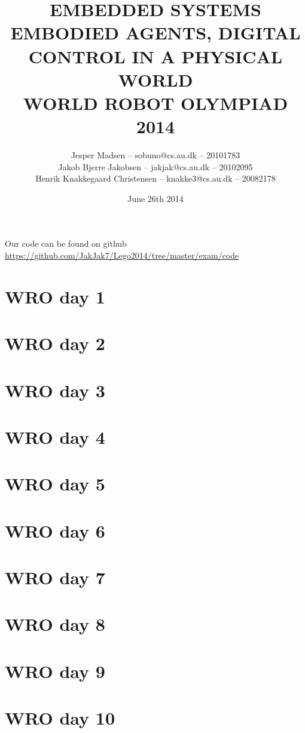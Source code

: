 \documentclass[a4paper,11pt,article,oneside]{memoir}
\title{EMBEDDED SYSTEMS\\\small{EMBODIED AGENTS, DIGITAL CONTROL IN A PHYSICAL WORLD\\WORLD ROBOT OLYMPIAD 2014}}
\author{Jesper Madsen -- sobuno@cs.au.dk -- 20101783\\Jakob Bjerre Jakobsen -- jakjak@cs.au.dk -- 20102095\\Henrik Knakkegaard Christensen -- knakke3@cs.au.dk -- 20082178}
\date{June 26th 2014}
\begin{document}
\maketitle
\newpage
Our code can be found on github\\
\url{https://github.com/JakJak7/Lego2014/tree/master/exam/code}
\newpage
\setcounter{tocdepth}{3}
\tableofcontents
\clearpage
\section{WRO day 1}

\clearpage
\section{WRO day 2}

\clearpage
\section{WRO day 3}

\clearpage
\section{WRO day 4}

\clearpage
\section{WRO day 5}

\clearpage
\section{WRO day 6}

\clearpage
\section{WRO day 7}

\clearpage
\section{WRO day 8}

\clearpage
\section{WRO day 9}

\clearpage
\section{WRO day 10}

\clearpage
\end{document}
